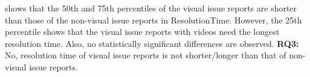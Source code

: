  shows that the 50th and 75th percentiles of the visual issue reports are shorter than those of the non-visual issue reports in ResolutionTime.
However, the 25th percentile shows that the visual issue reports with videos need the longest resolution time. 
Also, no statistically significant differences are observed. 
\vspace{-0.2cm}%
\summarybox
{{\bf RQ3: }{
    No, resolution time of visual issue reports is not shorter/longer than that of non-visual issue reports.
}}




